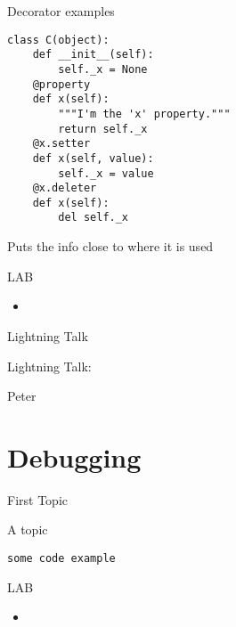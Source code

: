 \documentclass{beamer}
\begin{document}
\begin{frame}[fragile]{Decorator examples}

\begin{verbatim}
class C(object):
    def __init__(self):
        self._x = None
    @property
    def x(self):
        """I'm the 'x' property."""
        return self._x
    @x.setter
    def x(self, value):
        self._x = value
    @x.deleter
    def x(self):
        del self._x
\end{verbatim}

\vfill
Puts the info close to where it is used
\end{frame} 



\begin{frame}{LAB}

\begin{itemize}
  \item
\end{itemize}

\end{frame}

\begin{frame}{Lightning Talk}

{\centering

\vfill
{\LARGE Lightning Talk:  }

\vfill
{\Huge Peter}

\vfill
}
\end{frame}


\section{Debugging}

\begin{frame}[fragile]{First Topic}

 {\Large A topic}

\begin{verbatim}
some code example
\end{verbatim}

\end{frame} 

\begin{frame}{LAB}

\begin{itemize}
  \item
\end{itemize}

\end{frame}
\end{document}
